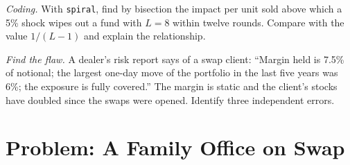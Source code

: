 \begin{exercise}[$\star\star\star$]\label{exo:m1:financing:7}
\emph{Coding.} With \texttt{spiral}, find by bisection the impact per unit
sold above which a 5\% shock wipes out a fund with $L = 8$ within twelve
rounds. Compare with the value $1/(L-1)$ and explain the relationship.
\end{exercise}

\begin{exercise}[$\star\star\star$]\label{exo:m1:financing:8}
\emph{Find the flaw.} A dealer's risk report says of a swap client: ``Margin
held is 7.5\% of notional; the largest one-day move of the portfolio in the
last five years was 6\%; the exposure is fully covered.'' The margin is
static and the client's stocks have doubled since the swaps were opened.
Identify three independent errors.
\end{exercise}

\section{Problem: A Family Office on Swap}

